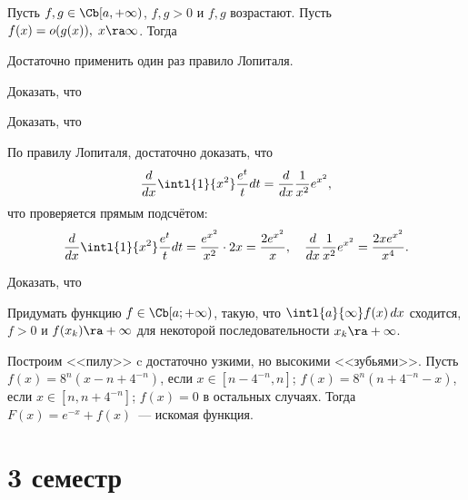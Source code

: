 \documentclass[a4paper]{article}
\begin{document}
\begin{problem}
Пусть $f, g \in \Cb[a, +\infty)$, $f, g >0$ и $f,g$ возрастают. Пусть $f(x) = o(g(x)), \; x \ra \infty$.
Тогда 
\end{problem}
\begin{solution}
Достаточно применить один раз правило Лопиталя.
\end{solution}

\begin{problem}
Доказать, что 
\end{problem}

\begin{problem}
Доказать, что 
\end{problem}
\begin{solution}
По правилу Лопиталя, достаточно доказать, что
$$\frac{d}{dx}\intl{1}{x^2}\frac{e^t}{t}dt=\frac{d}{dx}\frac{1}{x^2}e^{x^2},$$
что проверяется прямым подсчётом:
$$\frac{d}{dx}\intl{1}{x^2}\frac{e^t}{t}dt=\frac{e^{x^2}}{x^2}\cdot 2x=
\frac{2e^{x^2}}x, \quad \frac{d}{dx}\frac{1}{x^2}e^{x^2}=\frac{2xe^{x^2}}{x^4}.$$
\hfill\end{solution}
\begin{problem}
Доказать, что 
\end{problem}

\begin{problem}
Придумать функцию $f \in \Cb[a; +\infty)$, такую, что $\intl{a}{\infty}f(x)\,dx$ сходится, $f > 0$ и $f(x_k)
\ra +\infty$ для некоторой последовательности $x_k \ra +\infty$.
\end{problem}
\begin{solution}
Построим <<пилу>> c достаточно узкими, но высокими <<зубьями>>. Пусть $f(x)=8^n(x-n+4^{-n})$, если
$x\in [n-4^{-n},n]$; $f(x)=8^n(n+4^{-n}-x)$, если $x\in [n,n+4^{-n}]$; $f(x)=0$ в остальных случаях. Тогда
$F(x)=e^{-x}+f(x)$~--- искомая функция.
\end{solution}

\pagebreak

\section{3 семестр}
\end{document}
